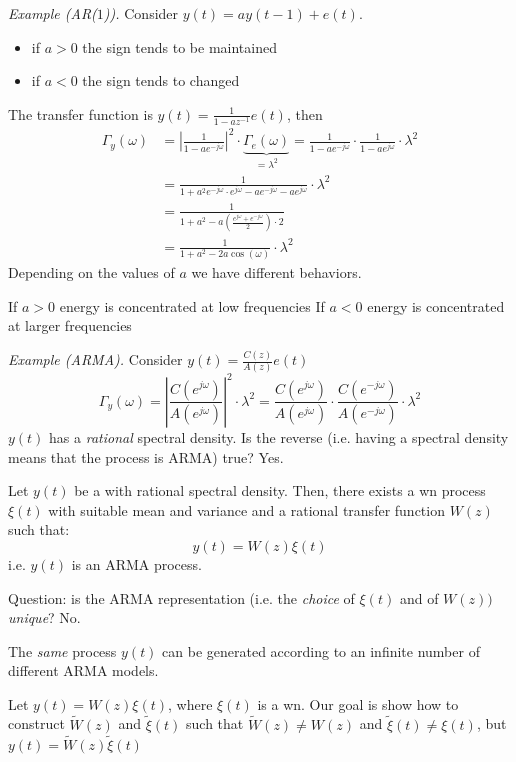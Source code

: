 \emph{Example (AR($1$)).}
Consider $y(t)=ay(t-1)+e(t)$.
\begin{itemize}
	\item if $a>0$ the sign tends to be maintained
	\item if $a<0$ the sign tends to changed
\end{itemize}
The transfer function is $y(t)=\frac{1}{1-az^{-1} }e(t)$, then
\begin{align*}
	\Gamma _{y}(\omega )&=\left|\frac{1}{1-ae^{-j\omega } }\right|^2 \cdot\underbrace{\Gamma _{e}(\omega )}_{=\lambda^2 } = \frac{1}{1-ae^{-j\omega}}\cdot\frac{1}{1-ae^{j\omega}} \cdot\lambda^2\\
	&=\frac{1}{1+a^2 e^{-j\omega }\cdot e^{j\omega }-ae^{-j\omega}-ae^{j\omega}} \cdot \lambda^2\\
	&=\frac{1}{1+a^2 -a\left( \frac{e^{j\omega}+e^{-j\omega}}{2} \right)\cdot 2}\\
	&=\frac{1}{1+a^2-2a\cos (\omega)} \cdot\lambda^2
\end{align*}
Depending on the values of $a$ we have different behaviors.

If $a>0$ energy is concentrated at low frequencies
If $a<0$ energy is concentrated at larger frequencies

\emph{Example (ARMA).}
Consider $y(t)=\frac{C(z)}{A(z)}e(t)$
\[
	\Gamma _{y}(\omega )=\left|\frac{C(e^{j\omega})}{A(e^{j\omega})}\right|^2 \cdot\lambda^2 =\frac{C(e^{j\omega})}{A(e^{j\omega} )} \cdot \frac{C(e^{-j\omega})}{A(e^{-j\omega} )}\cdot\lambda^2 
\]
$y(t)$ has a \emph{rational} spectral density. Is the reverse (i.e. having a spectral density means that the process is ARMA) true? Yes.

\begin{theorem}
	Let $y(t)$ be a \ssp with rational spectral density.
	Then, there exists a \gls{wn} process $\xi(t)$ with suitable mean and variance and a rational transfer function $W(z)$ such that:
	\[
		y(t)=W(z)\xi(t)
	\]
	i.e. $y(t)$ is an ARMA process.
\end{theorem}

Question: is the ARMA representation (i.e. the \emph{choice} of $\xi(t)$ and of $W(z))$ \emph{unique}? No.

The \emph{same} process $y(t)$ can be generated according to an infinite number of different ARMA models.

Let $y(t)=W(z)\xi(t)$, where $\xi(t)$ is a \gls{wn}. Our goal is show how to construct $\tilde{W}(z)$ and $\tilde{\xi}(t)$ such that $\tilde{W}(z)\neq W(z)$ and $\tilde{\xi}(t)\neq \xi(t)$, but $y(t)=\tilde W(z)\tilde\xi(t)$

